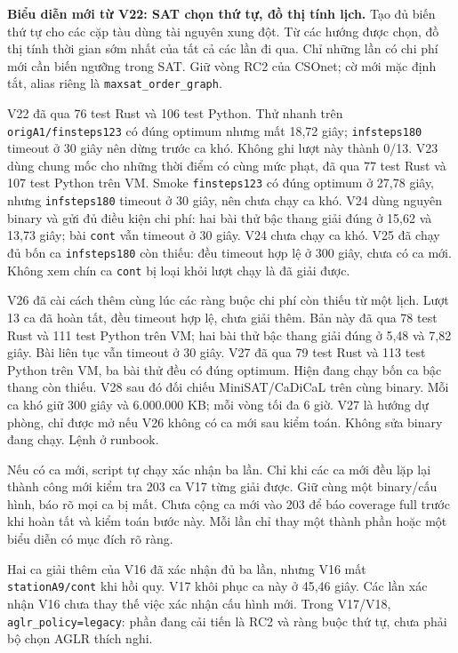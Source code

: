 \documentclass[11pt,a4paper]{article}
\newcommand{\code}[1]{\texttt{#1}}
\begin{document}
\textbf{Biểu diễn mới từ V22: SAT chọn thứ tự, đồ thị tính lịch.} Tạo đủ
biến thứ tự cho các cặp tàu dùng tài nguyên xung đột. Từ các hướng được
chọn, đồ thị tính thời gian sớm nhất của tất cả các lần đi qua. Chỉ những
lần có chi phí mới cần biến ngưỡng trong SAT. Giữ vòng RC2 của CSOnet;
cờ mới mặc định tắt, alias riêng là \code{maxsat\_order\_graph}.

V22 đã qua 76 test Rust và 106 test Python. Thử nhanh trên
\code{origA1/finsteps123} có đúng optimum nhưng mất 18,72 giây;
\code{infsteps180} timeout ở 30 giây nên dừng trước ca khó. Không ghi lượt
này thành 0/13. V23 dùng chung mốc cho những thời điểm có cùng mức phạt,
đã qua 77 test Rust và 107 test Python trên VM. Smoke \code{finsteps123} có đúng optimum ở 27,78 giây, nhưng
\code{infsteps180} timeout ở 30 giây, nên chưa chạy ca khó. V24 dùng
nguyên binary và gửi đủ điều kiện chi phí: hai bài thử bậc thang giải
đúng ở 15,62 và 13,73 giây; bài \code{cont} vẫn timeout ở 30 giây. V24
chưa chạy ca khó. V25 đã chạy đủ bốn ca \code{infsteps180} còn thiếu: đều timeout hợp lệ
ở 300 giây, chưa có ca mới. Không xem chín ca \code{cont} bị loại khỏi
lượt chạy là đã giải được.

V26 đã cài cách thêm cùng lúc các ràng buộc chi phí còn thiếu từ một
lịch. Lượt 13 ca đã hoàn tất, đều timeout hợp lệ, chưa giải thêm. Bản này đã qua 78 test Rust và 111 test Python trên VM; hai bài
thử bậc thang giải đúng ở 5,48 và 7,82 giây. Bài liên tục vẫn timeout
ở 30 giây. V27 đã qua 79 test Rust và 113 test Python trên VM, ba bài thử đều có
đúng optimum. Hiện đang chạy bốn ca bậc thang còn thiếu. V28 sau đó đối chiếu MiniSAT/CaDiCaL trên cùng binary. Mỗi ca khó giữ 300 giây và 6.000.000 KB; mỗi vòng tối đa 6 giờ.
V27 là hướng dự phòng, chỉ được mở nếu V26 không có ca mới sau kiểm toán.
Không sửa binary đang chạy. Lệnh ở runbook.

Nếu có ca mới, script tự chạy xác nhận ba lần. Chỉ khi các ca mới đều
lặp lại thành công mới kiểm tra 203 ca V17 từng giải được. Giữ cùng một
binary/cấu hình, báo rõ mọi ca bị mất. Chưa cộng ca mới vào 203 để báo
coverage full trước khi hoàn tất và kiểm toán bước này. Mỗi lần chỉ
thay một thành phần hoặc một biểu diễn có mục đích rõ ràng.

Hai ca giải thêm của V16 đã xác nhận đủ ba lần, nhưng V16 mất
\code{stationA9/cont} khi hồi quy. V17 khôi phục ca này ở 45,46 giây.
Các lần xác nhận V16 chưa thay thế việc xác nhận cấu hình mới.
Trong V17/V18, \code{aglr\_policy=legacy}: phần đang cải tiến là RC2 và
ràng buộc thứ tự, chưa phải bộ chọn AGLR thích nghi.
\end{document}
